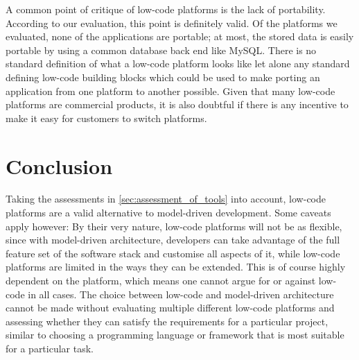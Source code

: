 \documentclass[runningheads]{llncs}
\begin{document}
A common point of critique of low-code platforms is the lack of portability. According to our evaluation, this point is definitely valid. Of the platforms we evaluated, none of the applications are portable; at most, the stored data is easily portable by using a common database back end like MySQL. There is no standard definition of what a low-code platform looks like let alone any standard defining low-code building blocks which could be used to make porting an application from one platform to another possible. Given that many low-code platforms are commercial products, it is also doubtful if there is any incentive to make it easy for customers to switch platforms.

\section{Conclusion}
\label{sec:conclusion}

Taking the assessments in \cref{sec:assessment_of_tools} into account, low-code platforms are a valid alternative to model-driven development. Some caveats apply however: By their very nature, low-code platforms will not be as flexible, since with model-driven architecture, developers can take advantage of the full feature set of the software stack and customise all aspects of it, while low-code platforms are limited in the ways they can be extended. This is of course highly dependent on the platform, which means one cannot argue for or against low-code in all cases. The choice between low-code and model-driven architecture cannot be made without evaluating multiple different low-code platforms and assessing whether they can satisfy the requirements for a particular project, similar to choosing a programming language or framework that is most suitable for a particular task.

\newpage
\printbibliography
\end{document}
